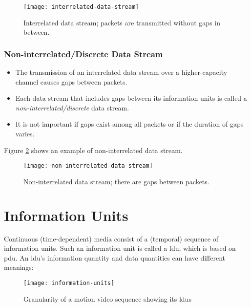 \begin{figure}[hb]
	\centering
	\texttt{[image: interrelated-data-stream]}
	\caption[Interrelated data stream.]{Interrelated data stream; packets are transmitted without gaps in between.}\label{fig:interrelated-data-stream}
\end{figure}

\subsubsection{Non-interrelated/Discrete Data Stream}
\begin{itemize}
	\item The transmission of an interrelated data stream over a higher-capacity channel
	causes gaps between packets.
	\item Each data stream that includes gaps between its information units is called a \textit{non-interrelated/discrete} data stream.
	\item It is not important if gaps exist among all packets or if the duration of gaps varies.
\end{itemize}
 Figure {\ref{fig:noninterrelated-data-stream}} shows an example of non-interrelated data stream.
 
\begin{figure}[ht!]
	\centering
	\texttt{[image: non-interrelated-data-stream]}
	\caption[Non-interrelated data stream.]{Non-interrelated data stream; there are gaps between packets.}\label{fig:noninterrelated-data-stream}
\end{figure}


\section{Information Units}
Continuous (time-dependent) media consist of a (temporal) sequence of information units. Such an information unit is called a \gls{ldu}, which is based on \gls{pdu}. An \gls{ldu}’s information quantity and data quantities can have different meanings:

\begin{figure}[hb!]                                                                    
	\centering
	\texttt{[image: information-units]}
	\caption[Information units.]{Granularity of a motion video sequence showing its \gls{ldu}s}\label{fig:information-units}
\end{figure}

